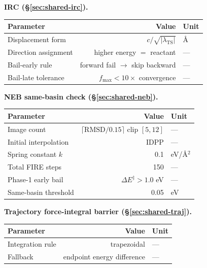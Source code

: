 \bigskip

\noindent\textbf{IRC (\S\ref{sec:shared-irc}).}\par\nopagebreak
\noindent\begin{tabular}{p{5cm}rl}
\toprule
Parameter & Value & Unit \\
\midrule
Displacement form & $c / \sqrt{|\lambda_\text{TS}|}$ & \AA \\
Direction assignment & higher energy $=$ reactant & --- \\
Bail-early rule & forward fail $\to$ skip backward & --- \\
Bail-late tolerance & $f_\text{max} < 10\times$ convergence & --- \\
\bottomrule
\end{tabular}

\bigskip

\noindent\textbf{NEB same-basin check (\S\ref{sec:shared-neb}).}\par\nopagebreak
\noindent\begin{tabular}{p{5cm}rl}
\toprule
Parameter & Value & Unit \\
\midrule
Image count & $\lceil \text{RMSD}/0.15 \rceil$ clip $[5, 12]$ & --- \\
Initial interpolation & IDPP & --- \\
Spring constant $k$ & 0.1 & eV/\AA$^2$ \\
Total FIRE steps & 150 & --- \\
Phase-1 early bail & $\Delta E^\ddagger > 1.0$ eV & --- \\
Same-basin threshold & 0.05 & eV \\
\bottomrule
\end{tabular}

\bigskip

\noindent\textbf{Trajectory force-integral barrier (\S\ref{sec:shared-traj}).}\par\nopagebreak
\noindent\begin{tabular}{p{5cm}rl}
\toprule
Parameter & Value & Unit \\
\midrule
Integration rule & trapezoidal & --- \\
Fallback & endpoint energy difference & --- \\
\bottomrule
\end{tabular}


